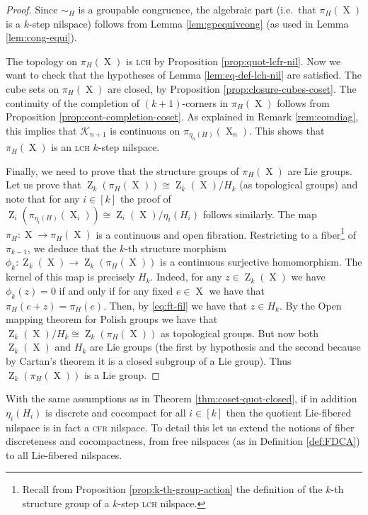 \documentclass[a4paper,12pt,reqno]{amsart}
\theoremstyle{definition}
\def\to{\rightarrow}
\newcommand{\mc}{\mathcal}
\DeclareMathOperator{\ab}{Z}
\DeclareMathOperator{\ns}{X}
\begin{document}
\begin{proof}
Since $\sim_H$ is a groupable congruence, the algebraic part (i.e.\ that $\pi_H(\ns)$ is a $k$-step nilspace) follows from Lemma \ref{lem:gpequivcong} (as used in Lemma \ref{lem:cong-equi}). 

The topology on $\pi_H(\ns)$ is \textsc{lch} by Proposition \ref{prop:quot-lcfr-nil}. Now we want to check that the hypotheses of Lemma \ref{lem:eq-def-lch-nil} are satisfied. The cube sets on $\pi_H(\ns)$ are closed, by Proposition \ref{prop:closure-cubes-coset}. The continuity of the completion of $(k+1)$-corners in $\pi_H(\ns)$ follows from Proposition \ref{prop:cont-completion-coset}. As explained in Remark \ref{rem:comdiag}, this implies that  $\mc{K}_{n+1}$ is continuous on $\pi_{\eta_n(H)}(\ns_n)$. This shows that $\pi_H(\ns)$ is an \textsc{lch} $k$-step nilspace.

Finally, we need to prove that the structure groups of $\pi_H(\ns)$ are Lie groups. Let us prove that $\ab_k(\pi_H(\ns)) \cong \ab_k(\ns)/H_k$ (as topological groups) and note that for any $i\in[k]$ the proof of $\ab_i(\pi_{\eta_i(H)}(\ns_i)) \cong \ab_i(\ns)/\eta_i(H_i)$ follows similarly. The map $\pi_H:\ns\to \pi_H(\ns)$ is a continuous and open fibration. Restricting to a fiber\footnote{Recall from Proposition \ref{prop:k-th-group-action} the definition of the $k$-th structure group of a $k$-step  \textsc{lch} nilspace.} of $\pi_{k-1}$, we deduce that the $k$-th structure morphism $\phi_k:\ab_k(\ns)\to \ab_k(\pi_H(\ns))$ is a continuous surjective homomorphism. The kernel of this map is precisely $H_k$. Indeed, for any $z\in \ab_k(\ns)$ we have $\phi_k(z)=0$ if and only if for any fixed $e\in \ns$ we have that $\pi_H(e+z)=\pi_H(e)$. Then, by \eqref{eq:ft-fil} we have that $z\in H_k$. By the Open mapping theorem for Polish groups we have that $\ab_k(\ns)/H_k \cong \ab_k(\pi_H(\ns))$ as topological groups. But now both $\ab_k(\ns)$ and $H_k$ are Lie groups (the first by hypothesis and the second because by Cartan's theorem it is a closed subgroup of a Lie group). Thus $\ab_k(\pi_H(\ns))$ is a Lie group.
\end{proof}

With the same assumptions as in Theorem \ref{thm:coset-quot-closed}, if in addition $\eta_i(H_i)$ is discrete and cocompact for all $i\in[k]$ then the quotient Lie-fibered nilspace is in fact a \textsc{cfr} nilspace. To detail this let us extend the notions of fiber discreteness and cocompactness, from free nilspaces (as in Definition \ref{def:FDCA}) to all Lie-fibered nilspaces.
\end{document}
